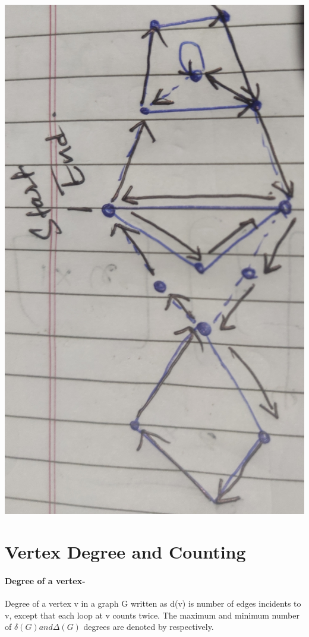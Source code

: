\begin{center}
    \includegraphics[scale=0.1, angle=-90]{eular_circuit}
\end{center}



\section{Vertex Degree and Counting}
\paragraph{Degree of a vertex-} Degree of a vertex v in a graph G written as d(v) is
number of edges incidents to v, except that each loop at v
counts twice. The maximum and minimum number of \( \delta(G) and \Delta(G)\)
degrees are denoted by respectively.

